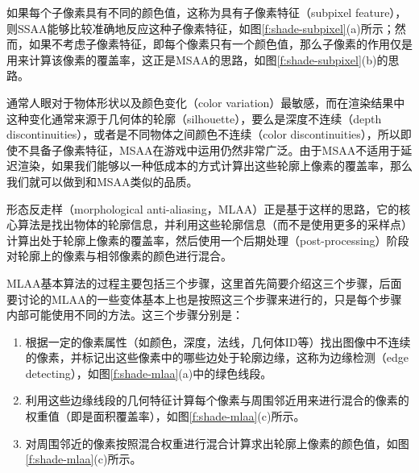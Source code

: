 如果每个子像素具有不同的颜色值，这称为具有子像素特征（subpixel feature），则SSAA能够比较准确地反应这种子像素特征，如图\ref{f:shade-subpixel}(a)所示；然而，如果不考虑子像素特征，即每个像素只有一个颜色值，那么子像素的作用仅是用来计算该像素的覆盖率，这正是MSAA的思路，如图\ref{f:shade-subpixel}(b)的思路。

通常人眼对于物体形状以及颜色变化（color variation）最敏感，而在渲染结果中这种变化通常来源于几何体的轮廓（silhouette），要么是深度不连续（depth discontinuities），或者是不同物体之间颜色不连续（color discontinuities），所以即使不具备子像素特征，MSAA在游戏中运用仍然非常广泛。由于MSAA不适用于延迟渲染，如果我们能够以一种低成本的方式计算出这些轮廓上像素的覆盖率，那么我们就可以做到和MSAA类似的品质。

形态反走样\cite{a:MorphologicalAntialiasing}（morphological anti-aliasing，MLAA）正是基于这样的思路，它的核心算法是找出物体的轮廓信息，并利用这些轮廓信息（而不是使用更多的采样点）计算出处于轮廓上像素的覆盖率，然后使用一个后期处理（post-processing）阶段对轮廓上的像素与相邻像素的颜色进行混合。

MLAA基本算法的过程主要包括三个步骤，这里首先简要介绍这三个步骤，后面要讨论的MLAA的一些变体基本上也是按照这三个步骤来进行的，只是每个步骤内部可能使用不同的方法。这三个步骤分别是：

\begin{enumerate}
	\item 根据一定的像素属性（如颜色，深度，法线，几何体ID等）找出图像中不连续的像素，并标记出这些像素中的哪些边处于轮廓边缘，这称为边缘检测（edge detecting），如图\ref{f:shade-mlaa}(a)中的绿色线段。
	\item 利用这些边缘线段的几何特征计算每个像素与周围邻近用来进行混合的像素的权重值（即是面积覆盖率），如图\ref{f:shade-mlaa}(c)所示。
	\item 对周围邻近的像素按照混合权重进行混合计算求出轮廓上像素的颜色值，如图\ref{f:shade-mlaa}(c)所示。
\end{enumerate}

